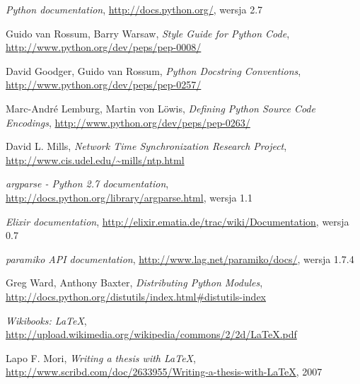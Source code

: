 \documentclass[00-praca-magisterska.tex]{subfiles}
\begin{document}
\begin{thebibliography}{9}
  \emph{Python documentation}, 
  \url{http://docs.python.org/},
  wersja 2.7

  Guido van Rossum, Barry Warsaw,
  \emph{Style Guide for Python Code},
  \url{http://www.python.org/dev/peps/pep-0008/}

  David Goodger, Guido van Rossum,
  \emph{Python Docstring Conventions},
  \url{http://www.python.org/dev/peps/pep-0257/}

  Marc-André Lemburg, Martin von Löwis,
  \emph{Defining Python Source Code Encodings},
  \url{http://www.python.org/dev/peps/pep-0263/}

  David L. Mills,
  \emph{Network Time Synchronization Research Project},
  \url{http://www.cis.udel.edu/~mills/ntp.html}

  \emph{argparse - Python 2.7 documentation},
  \url{http://docs.python.org/library/argparse.html},
  wersja 1.1

  \emph{Elixir documentation},
  \url{http://elixir.ematia.de/trac/wiki/Documentation},
  wersja 0.7


  \emph{paramiko API documentation},
  \url{http://www.lag.net/paramiko/docs/},
  wersja 1.7.4

  Greg Ward, Anthony Baxter,
  \emph{Distributing Python Modules},
  \url{http://docs.python.org/distutils/index.html#distutils-index}

  \emph{Wikibooks: \LaTeX},
  \url{http://upload.wikimedia.org/wikipedia/commons/2/2d/LaTeX.pdf}

  Lapo F. Mori, 
  \emph{Writing a thesis with \LaTeX},
  \url{http://www.scribd.com/doc/2633955/Writing-a-thesis-with-LaTeX},
  2007

\end{thebibliography}


\end{document}
